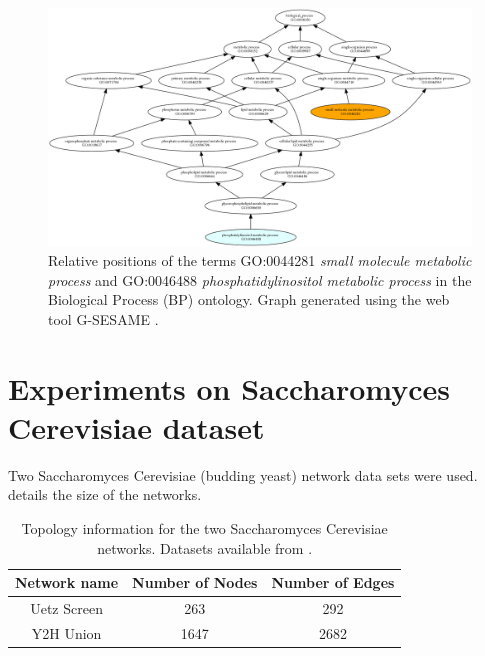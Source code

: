 \documentclass{report}
\begin{document}
	\begin{figure}
		\centering
		\includegraphics[width=\textwidth]{../go_term_graph.png}
		\caption{Relative positions of the terms GO:0044281 \textit{small molecule metabolic process} and GO:0046488 \textit{phosphatidylinositol metabolic process} in the Biological Process (BP) ontology. Graph generated using the web tool G-SESAME \protect\cite{du2009g}.}
		\label{go_term_graph}
	\end{figure}
	
	\section{Experiments on Saccharomyces Cerevisiae dataset}	

	
	Two Saccharomyces Cerevisiae (budding yeast) network data sets were used.  details the size of the networks. 
		
	\begin{table}
		\centering
		\begin{tabular}{c c c}
			\toprule
			\textbf{Network name} & \textbf{Number of Nodes} & \textbf{Number of Edges} \\ \bottomrule
			Uetz Screen & 263 & 292 \\
			Y2H Union & 1647 & 2682 \\ \bottomrule
		\end{tabular}
		\caption{Topology information for the two Saccharomyces Cerevisiae networks. Datasets available from \protect\cite{uetz,union}.}
		\label{yeast_networks}
	\end{table}
	
\end{document}
